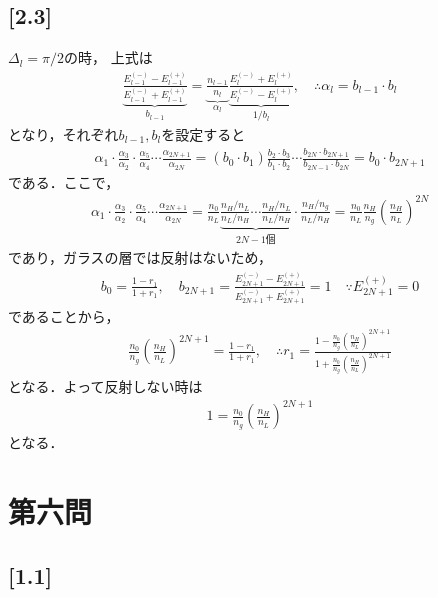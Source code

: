 \documentclass[12pt,dvipdfmx]{jsarticle}
\begin{document}
\subsection*{\large{[2.3]}}
$\Delta_{l}=\pi/2$の時，
上式は
\begin{eqnarray}
  \underbrace{\frac{E_{l-1}^{(-)}-E_{l-1}^{(+)}}{E_{l-1}^{(-)}+E_{l-1}^{(+)}}}_{b_{l-1}} = \underbrace{\frac{n_{l-1}}{n_l}}_{\alpha_l}\underbrace{\frac{E_l^{(-)}+E_l^{(+)}}{E_l^{(-)}-E_l^{(+)}}}_{1/b_l}, \quad\therefore \alpha_l = b_{l-1}\cdot b_l
\end{eqnarray}
となり，それぞれ$b_{l-1},b_l$を設定すると
\begin{eqnarray}
  \alpha_1\cdot \frac{\alpha_3}{\alpha_2}\cdot\frac{\alpha_5}{\alpha_4}\cdots \frac{\alpha_{2N+1}}{\alpha_{2N}} = (b_0\cdot b_1)\frac{b_2 \cdot b_3}{b_1 \cdot b_2}\cdots \frac{b_{2N}\cdot b_{2N+1}}{b_{2N-1}\cdot b_{2N}} = b_0 \cdot b_{2N+1}
\end{eqnarray}
である．ここで，
\begin{eqnarray}
  \alpha_1\cdot \frac{\alpha_3}{\alpha_2}\cdot\frac{\alpha_5}{\alpha_4}\cdots \frac{\alpha_{2N+1}}{\alpha_{2N}}  = \frac{n_0}{n_L}\underbrace{\frac{n_H/n_L}{n_L/n_H}\cdots \frac{n_H/n_L}{n_L/n_H}}_{2N-1個} \cdot \frac{n_H/n_g}{n_L/n_H} = \frac{n_0}{n_L}\frac{n_H}{n_g}\left( \frac{n_H}{n_L} \right)^{2N}
\end{eqnarray}
であり，ガラスの層では反射はないため，
\begin{eqnarray}
  b_0 = \frac{1-r_1}{1+r_1}, \quad b_{2N+1} = \frac{E_{2N+1}^{(-)}-E_{2N+1}^{(+)}}{E_{2N+1}^{(-)}+E_{2N+1}^{(+)}} =1 \quad\because E_{2N+1}^{(+)} =0
\end{eqnarray}
であることから，
\begin{eqnarray}
  \frac{n_0}{n_g}\left( \frac{n_H}{n_L} \right)^{2N+1} = \frac{1-r_1}{1+r_1}, \quad\therefore r_1 = \frac{1-\frac{n_0}{n_g}\left( \frac{n_H}{n_L} \right)^{2N+1}}{1+\frac{n_0}{n_g}\left( \frac{n_H}{n_L} \right)^{2N+1}}
\end{eqnarray}
となる．よって反射しない時は
\begin{eqnarray}
  1 = \frac{n_0}{n_g}\left( \frac{n_H}{n_L} \right)^{2N+1}
\end{eqnarray}
となる．

\section*{\Large{第六問}}
\subsection*{\large{[1.1]}}
\end{document}
